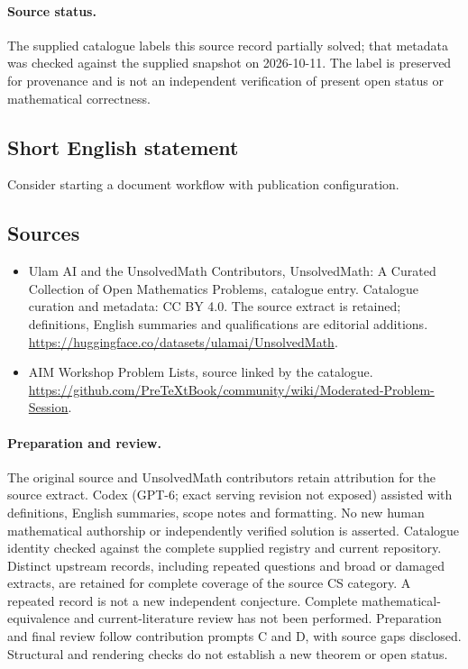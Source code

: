 \documentclass[11pt]{article}
\begin{document}
\paragraph{Source status.}
The supplied catalogue labels this source record partially solved; that metadata was checked against the supplied snapshot on 2026-10-11. The label is preserved for provenance and is not an independent verification of present open status or mathematical correctness.
\subsection{Short English statement}
Consider starting a document workflow with publication configuration.
\subsection{Sources}
\begin{itemize}
\item[\hypertarget{source:statement:1}{S1}] Ulam AI and the UnsolvedMath Contributors, UnsolvedMath: A Curated Collection of Open Mathematics Problems, catalogue entry. Catalogue curation and metadata: CC BY 4.0. The source extract is retained; definitions, English summaries and qualifications are editorial additions.
\url{https://huggingface.co/datasets/ulamai/UnsolvedMath}.
\item[\hypertarget{source:statement:2}{S2}] AIM Workshop Problem Lists, source linked by the catalogue.
\url{https://github.com/PreTeXtBook/community/wiki/Moderated-Problem-Session}.
\end{itemize}
\paragraph{Preparation and review.}
The original source and UnsolvedMath contributors retain attribution for the source extract. Codex (GPT-6; exact serving revision not exposed) assisted with definitions, English summaries, scope notes and formatting. No new human mathematical authorship or independently verified solution is asserted. Catalogue identity checked against the complete supplied registry and current repository. Distinct upstream records, including repeated questions and broad or damaged extracts, are retained for complete coverage of the source CS category. A repeated record is not a new independent conjecture. Complete mathematical-equivalence and current-literature review has not been performed. Preparation and final review follow contribution prompts C and D, with source gaps disclosed. Structural and rendering checks do not establish a new theorem or open status.
\label{end:statement}
\end{document}
